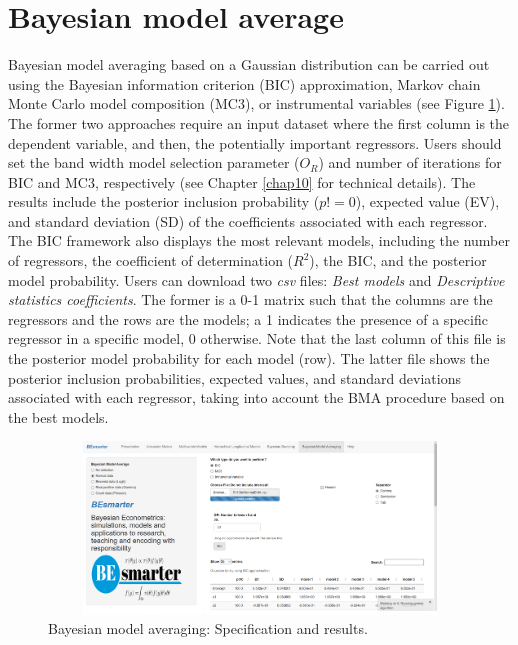 \section{Bayesian model average}\label{secGUI6}

Bayesian model averaging based on a Gaussian distribution can be carried out using the Bayesian information criterion (BIC) approximation, Markov chain Monte Carlo model composition (MC3), or instrumental variables (see Figure \ref{fig69}). The former two approaches require an input dataset where the first column is the dependent variable, and then, the potentially important regressors.
Users should set the band width model selection parameter ($O_R$) and number of iterations for BIC and MC3, respectively (see Chapter \ref{chap10} for technical details). The results include the posterior inclusion probability ($p!=0$), expected value (EV), and standard deviation (SD) of the coefficients associated with each regressor. The BIC framework also displays the most relevant models, including the number of regressors, the coefficient of determination ($R^2$), the BIC, and the posterior model probability. Users can download two \textit{csv} files: \textit{Best models} and \textit{Descriptive statistics coefficients}. The former is a 0-1 matrix such that the columns are the regressors and the rows are the models; a 1 indicates the presence of a specific regressor in a specific model, 0 otherwise. Note that the last column of this file is the posterior model probability for each model (row). The latter file shows the posterior inclusion probabilities, expected values, and standard deviations associated with each regressor, taking into account the BMA procedure based on the best models.

\begin{figure}
	\includegraphics[width=340pt, height=130pt]{Chapters/chapterGUI/figures/Figure9.png}
	\caption[List of figure caption goes here]{Bayesian model averaging: Specification and results.}\label{fig69}
\end{figure} 

